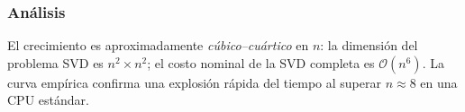 \subsubsection{Análisis}
El crecimiento es aproximadamente \emph{cúbico–cuártico} en $n$:
la dimensión del problema SVD es $n^2\times n^2$; el costo nominal de la SVD
completa es $\mathcal O(n^6)$.  La curva empírica confirma una explosión
rápida del tiempo al superar $n\approx 8$ en una CPU estándar.

